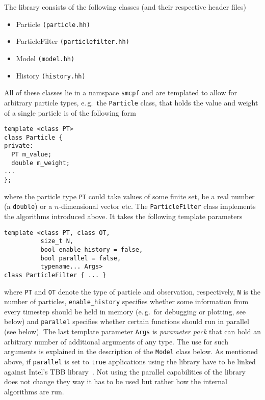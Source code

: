 The library consists of the following classes (and their respective
header files)
\begin{itemize}
\item Particle \texttt{(particle.hh)}
\item ParticleFilter \texttt{(particlefilter.hh)}
\item Model \texttt{(model.hh)}
\item History \texttt{(history.hh)}
\end{itemize}
All of these classes lie in a namspace \texttt{smcpf} and are
templated to allow for arbitrary particle types, e.\,g.\ the
\texttt{Particle} class, that holds the value and weight of a single
particle is of the following form
\begin{verbatim}
template <class PT> 
class Particle {
private:
  PT m_value;
  double m_weight;
...
}; 
\end{verbatim}
where the particle type \texttt{PT} could take values of some finite
set, be a real number (\ie a \texttt{double}) or a $n$-dimensional
vector etc. The \texttt{ParticleFilter} class implements the
algorithms introduced above. It takes the following template
parameters
\begin{verbatim}
template <class PT, class OT, 
          size_t N, 
          bool enable_history = false,
          bool parallel = false, 
          typename... Args>
class ParticleFilter { ... }

\end{verbatim}
where \texttt{PT} and \texttt{OT} denote the type of particle and
observation, respectively, \texttt{N} is the number of particles,
\texttt{enable\_history} specifies whether some information from every
timestep should be held in memory (e.\,g.\ for debugging or plotting,
see below) and \texttt{parallel} specifies whether certain functions
should run in parallel (see below). The last template parameter
\texttt{Args} is \emph{parameter pack} that can hold an arbitrary
number of additional arguments of any type. The use for such arguments
is explained in the description of the \texttt{Model} class below.  As
mentioned above, if \texttt{parallel} is set to \texttt{true}
applications using the library have to be linked against Intel's TBB
library~\cite{intel}. Not using the parallel capabilities of the
library does not change they way it has to be used but rather how the
internal algorithms are run.

